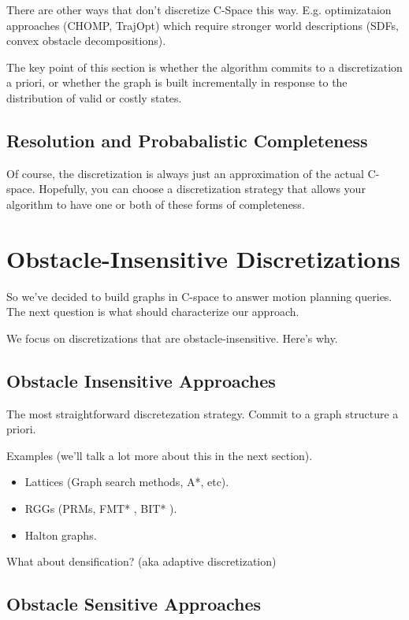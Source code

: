 There are other ways that don't discretize C-Space this way.
E.g. optimizataion approaches (CHOMP, TrajOpt) which require
stronger world descriptions (SDFs, convex obstacle decompositions).

The key point of this section is whether the algorithm commits to
a discretization a priori,
or whether the graph is built incrementally in response to the
distribution of valid or costly states.

\subsection{Resolution and Probabalistic Completeness}

Of course, the discretization is always just an approximation
of the actual C-space.
Hopefully, you can choose a discretization strategy that allows your
algorithm to have one or both of these forms of completeness.

\section{Obstacle-Insensitive Discretizations}

So we've decided to build graphs in C-space to answer motion planning
queries.
The next question is what should characterize our approach.

We focus on discretizations that are obstacle-insensitive.
Here's why.

\subsection{Obstacle Insensitive Approaches}

The most straightforward discretezation strategy.
Commit to a graph structure a priori.

Examples (we'll talk a lot more about this in the next section).
\begin{itemize}
\item Lattices (Graph search methods, A*, etc).
\item RGGs (PRMs, FMT* \citep{janson2015fmtstar},
   BIT* \citep{gammell2015bitstar}).
\item Halton graphs.
\end{itemize}

What about densification? (aka adaptive discretization)

\subsection{Obstacle Sensitive Approaches}

